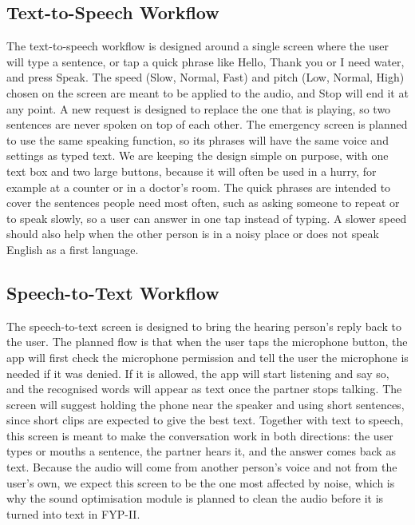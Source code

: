 \documentclass{FastFyp}
\begin{document}
\subsection{Text-to-Speech Workflow}
The text-to-speech workflow is designed around a single screen where the user will type a sentence, or tap a quick phrase like Hello, Thank you or I need water, and press Speak. The speed (Slow, Normal, Fast) and pitch (Low, Normal, High) chosen on the screen are meant to be applied to the audio, and Stop will end it at any point. A new request is designed to replace the one that is playing, so two sentences are never spoken on top of each other. The emergency screen is planned to use the same speaking function, so its phrases will have the same voice and settings as typed text. We are keeping the design simple on purpose, with one text box and two large buttons, because it will often be used in a hurry, for example at a counter or in a doctor's room. The quick phrases are intended to cover the sentences people need most often, such as asking someone to repeat or to speak slowly, so a user can answer in one tap instead of typing. A slower speed should also help when the other person is in a noisy place or does not speak English as a first language.

\subsection{Speech-to-Text Workflow}
The speech-to-text screen is designed to bring the hearing person's reply back to the user. The planned flow is that when the user taps the microphone button, the app will first check the microphone permission and tell the user the microphone is needed if it was denied. If it is allowed, the app will start listening and say so, and the recognised words will appear as text once the partner stops talking. The screen will suggest holding the phone near the speaker and using short sentences, since short clips are expected to give the best text. Together with text to speech, this screen is meant to make the conversation work in both directions: the user types or mouths a sentence, the partner hears it, and the answer comes back as text. Because the audio will come from another person's voice and not from the user's own, we expect this screen to be the one most affected by noise, which is why the sound optimisation module is planned to clean the audio before it is turned into text in FYP-II.
\end{document}
